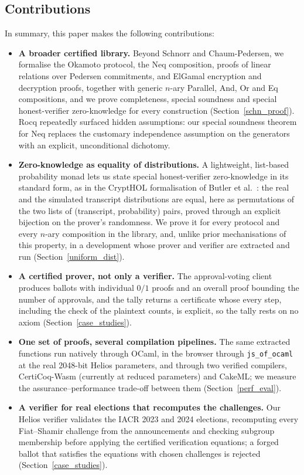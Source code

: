\documentclass[sigconf,anonymous,review]{acmart}
\begin{document}
\subsection{Contributions}
In summary, this paper makes the following contributions:
\begin{itemize}
  \item \textbf{A broader certified library.} Beyond Schnorr and Chaum-Pedersen, we formalise the Okamoto protocol, the Neq composition, proofs of linear relations over Pedersen commitments, and ElGamal encryption and decryption proofs, together with generic $n$-ary Parallel, And, Or and Eq compositions, and we prove completeness, special soundness and special honest-verifier zero-knowledge for every construction (Section~\ref{schn_proof}). Rocq repeatedly surfaced hidden assumptions: our special soundness theorem for Neq replaces the customary independence assumption on the generators with an explicit, unconditional dichotomy.
  \item \textbf{Zero-knowledge as equality of distributions.} A lightweight, list-based probability monad lets us state special honest-verifier zero-knowledge in its standard form, as in the CryptHOL formalisation of Butler et al.~\cite{butler2021formalising}: the real and the simulated transcript distributions are equal, here as permutations of the two lists of (transcript, probability) pairs, proved through an explicit bijection on the prover's randomness. We prove it for every protocol and every $n$-ary composition in the library, and, unlike prior mechanisations of this property, in a development whose prover and verifier are extracted and run (Section~\ref{uniform_dist}).
  \item \textbf{A certified prover, not only a verifier.} The approval-voting client produces ballots with individual $0/1$ proofs and an overall proof bounding the number of approvals, and the tally returns a certificate whose every step, including the check of the plaintext counts, is explicit, so the tally rests on no axiom (Section~\ref{case_studies}).
  \item \textbf{One set of proofs, several compilation pipelines.} The same extracted functions run natively through OCaml, in the browser through \texttt{js\_of\_ocaml} at the real 2048-bit Helios parameters, and through two verified compilers, CertiCoq-Wasm (currently at reduced parameters) and CakeML; we measure the assurance--performance trade-off between them (Section~\ref{perf_eval}).
  \item \textbf{A verifier for real elections that recomputes the challenges.} Our Helios verifier validates the IACR 2023 and 2024 elections, recomputing every Fiat--Shamir challenge from the announcements and checking subgroup membership before applying the certified verification equations; a forged ballot that satisfies the equations with chosen challenges is rejected (Section~\ref{case_studies}).

\end{itemize}
\end{document}
